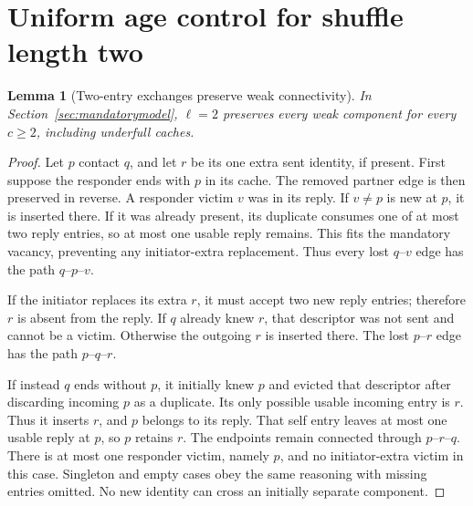 \documentclass[11pt]{article}
\newtheorem{lemma}[theorem]{Lemma}
\begin{document}
\section{Uniform age control for shuffle length two}
\label{sec:two}

\begin{lemma}[Two-entry exchanges preserve weak connectivity]
\label{lem:twoconnect}
In Section~\ref{sec:mandatorymodel}, $\ell=2$ preserves every
weak component for every $c\ge2$, including underfull caches.
\end{lemma}
\begin{proof}
Let $p$ contact $q$, and let $r$ be its one extra sent identity,
if present. First suppose the responder ends with $p$ in its
cache. The removed partner edge is then preserved in reverse.
A responder victim $v$ was in its reply. If $v\ne p$ is new
at $p$, it is inserted there. If it was already present,
its duplicate consumes one of at most two reply entries, so
at most one usable reply remains. This fits the mandatory
vacancy, preventing any initiator-extra replacement.
Thus every lost $q$--$v$ edge has the path $q$--$p$--$v$.

If the initiator replaces its extra $r$, it must accept two
new reply entries; therefore $r$ is absent from the reply.
If $q$ already knew $r$, that descriptor was not sent and
cannot be a victim. Otherwise the outgoing $r$ is inserted
there. The lost $p$--$r$ edge has the path $p$--$q$--$r$.

If instead $q$ ends without $p$, it initially knew $p$ and
evicted that descriptor after discarding incoming $p$ as a
duplicate. Its only possible usable incoming entry is $r$.
Thus it inserts $r$, and $p$ belongs to its reply. That self
entry leaves at most one usable reply at $p$, so $p$ retains
$r$. The endpoints remain connected through $p$--$r$--$q$.
There is at most one responder victim, namely $p$, and no
initiator-extra victim in this case. Singleton and empty
cases obey the same reasoning with missing entries omitted.
No new identity can cross an initially separate component.
\end{proof}
\end{document}
